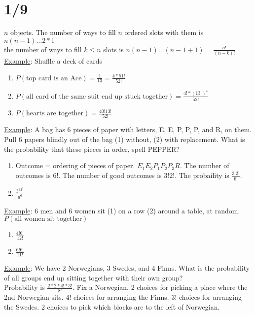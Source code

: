 \section*{1/9}
  $n$ objects. The number of ways to fill $n$ ordered slots with them is
  $n(n-1)\ldots 2*1$\\
  the number of ways to fill $k \le n$ slots is $n(n-1)\ldots (n-1+1) =
  \frac{n!}{(n-k)!}$\\
  \underline{Example}: Shuffle a deck of cards\\
  \begin{enumerate}
    \item $P(\text{top card is an Ace}) = \frac{1}{13} = \frac{4 * 51!}{52!}$
    \item $P(\text{all card of the same suit end up stuck together}) = 
    \frac{4! * (13!)^4}{52!}$
    \item $P(\text{hearts are together}) = \frac{40!13!}{52!}$
  \end{enumerate}
  \underline{Example}: A bag has 6 pieces of paper with letters, E, E, P, P, P,
  and R, on them. Pull 6 papers blindly out of the bag (1) without, (2) with
  replacement. What is the probability that these pieces in order, spell
  PEPPER?\\
  \begin{enumerate}
    \item Outcome = ordering of pieces of paper. $E_1E_2P_1P_2P_3R$. The
    number of outcomes is $6!$. The number of good outcomes is $3!2!$. The
    probaility is $\frac{3!2!}{6!}$.
    \item $\frac{3^32^2}{6^6}$
  \end{enumerate}
  \underline{Example}: $6$ men and $6$ women sit (1) on a row (2) around a table,
  at random. $P(\text{all women sit together})$
  \begin{enumerate}
    \item $\frac{4!6!}{12!}$
    \item $\frac{6!6!}{11!}$
  \end{enumerate}
  \underline{Example}: We have 2 Norwegians, 3 Swedes, and 4 Finns. What is the
  probability of all groups end up sitting together with their own group?\\
  Probability is $\frac{2*2*4!*3!}{8!}$. Fix a Norwegian. 2 choices for picking
  a place where the 2nd Norwegian sits. 4! choices for arranging the Finns.
  3! choices for arranging the Swedes. 2 choices to pick which blocks are
  to the left of Norwegian.
